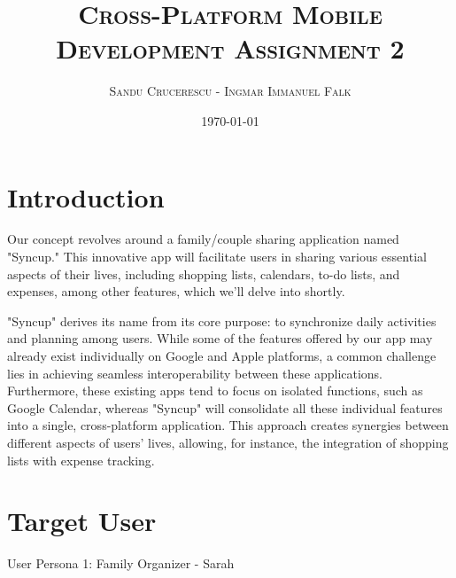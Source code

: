 \documentclass[12pt]{article}
\begin{document}
\title{\textsc{Cross-Platform Mobile Development \linebreak  \large{Assignment 2} }}
\author{\textsc{Sandu Crucerescu - Ingmar Immanuel Falk}}
\date{\textsc{\today}}

\maketitle
\pagebreak

\tableofcontents
\pagebreak

\section{Introduction}

Our concept revolves around a family/couple sharing application named "Syncup." 
This innovative app will facilitate users in sharing various essential aspects of their lives,
 including shopping lists, calendars, to-do lists, and expenses, among other features, which we'll delve into shortly.

"Syncup" derives its name from its core purpose: to synchronize daily activities and planning 
among users. While some of the features offered by our app may already exist individually 
on Google and Apple platforms, a common challenge lies in achieving seamless interoperability 
between these applications. Furthermore, these existing apps tend to focus on isolated functions, 
such as Google Calendar, whereas "Syncup" will consolidate all these individual features into a single,
 cross-platform application. This approach creates synergies between different aspects of users' lives, 
 allowing, for instance, the integration of shopping lists with expense tracking.

\section{Target User}

User Persona 1: Family Organizer - Sarah
\end{document}
